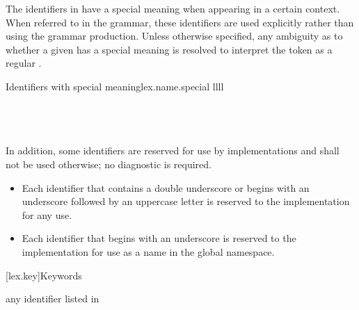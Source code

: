 \documentclass{wg21}
\begin{document}
\pnum
{}%
%
%
%
The identifiers in  have a special meaning when
appearing in a certain context. When referred to in the grammar, these identifiers
are used explicitly rather than using the  grammar production.
Unless otherwise specified, any ambiguity as to whether a given
 has a special meaning is resolved to interpret the
token as a regular .

\begin{multicolfloattable}{Identifiers with special meaning}{lex.name.special}
    {llll}
               \\
    \columnbreak
              \\
    \columnbreak
              \\
    \columnbreak
            \\
\end{multicolfloattable}

\pnum
{}%
%
%
In addition, some identifiers are reserved for use by \Cpp{}
implementations and shall
not be used otherwise; no diagnostic is required.
\begin{itemize}
    \item
    Each identifier that contains a double underscore
    \tcode{\unun}
    or begins with an underscore followed by
    an uppercase letter 
    is reserved to the implementation for any use.


    \item
    Each identifier that begins with an underscore is
    reserved to the implementation for use as a name in the global namespace.%
\end{itemize}%

[lex.key]{Keywords}

\begin{bnf}
    \br
    \textnormal{any identifier listed in }\br
    \br
    \br
\end{bnf}
\end{document}

